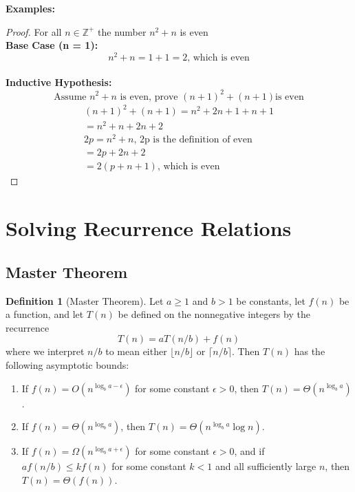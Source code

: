 \documentclass[12pt]{article}
\theoremstyle{definition}
\newtheorem{definition}{Definition}
\begin{document}
	\noindent \textbf{Examples:}

	\begin{proof} For all $n \in \mathbb{Z}^+$ the number $n^2 + n$ is even \\
		\textbf{Base Case (n = 1):} 
		$$n^2 + n = 1 + 1 = 2\text{, which is even}$$ \\
		\textbf{Inductive Hypothesis:}
		$$\text{Assume }n^2 + n\text{ is even, prove }(n + 1)^2 + (n + 1)\text{
		is even}$$
		\begin{gather}
			(n + 1)^2 + (n + 1) = n^2 + 2n + 1 + n + 1 \\
			= n^2 + n + 2n + 2 \\
			2p = n^2 + n\text{, 2p is the definition of even} \\
			= 2p + 2n + 2 \\
			= 2(p + n + 1)\text{, which is even}
		\end{gather}
	\end{proof}


	\section{Solving Recurrence Relations}

	\subsection{Master Theorem}

	\begin{definition}[Master Theorem]
		Let $a \geq 1$ and $b > 1$ be constants, let $f(n)$ be a function, and
		let $T(n)$ be defined on the nonnegative integers by the recurrence
		$$T(n) = aT(n/b) + f(n)$$
		where we interpret $n/b$ to mean either $\lfloor n/b \rfloor$ or
		$\lceil n/b \rceil$. Then $T(n)$ has the following asymptotic bounds:
		\begin{enumerate}
			\item If $f(n) = O(n^{\log_b a - \epsilon})$ for some constant
				$\epsilon > 0$, then $T(n) = \Theta(n^{\log_b a})$.
			\item If $f(n) = \Theta(n^{\log_b a})$, then $T(n) = \Theta(n^{\log_b
				a} \log n)$.
			\item If $f(n) = \Omega(n^{\log_b a + \epsilon})$ for some constant
				$\epsilon > 0$, and if $a f(n/b) \leq k f(n)$ for some constant
				$k < 1$ and all sufficiently large $n$, then $T(n) = \Theta(f(n))$.
		\end{enumerate}
	\end{definition}
\end{document}

